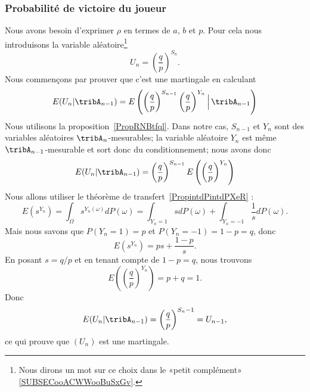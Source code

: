 \subsubsection{Probabilité de victoire du joueur}

Nous avons besoin d'exprimer \( \rho\) en termes de \( a\), \( b\) et \( p\). Pour cela nous introduisons la variable aléatoire\footnote{Nous dirons un mot sur ce choix dans le «petit complément» \ref{SUBSECooACWWooBuSxGv}.}
\begin{equation}    \label{EqFUsSnit}
	U_n=\left( \frac{ q }{ p } \right)^{S_n}.
\end{equation}
Nous commençons par prouver que c'est une martingale en calculant
\begin{equation}
	E(U_n|\tribA_{n-1})=E\left( \left( \frac{ q }{ p } \right)^{S_{n-1}}\left( \frac{ q }{ p } \right)^{Y_n} \Big |\,\tribA_{n-1} \right)
\end{equation}
Nous utilisons la proposition~\ref{PropRNBtfql}. Dans notre cas, \( S_{n-1}\) et \( Y_n\) sont des variables aléatoires \( \tribA_n\)-mesurables; la variable aléatoire \( Y_n\) est même \( \tribA_{n-1}\)-mesurable et sort donc du conditionnement; nous avons donc
\begin{equation}    \label{EqWTkXcEK}
	E(U_n|\tribA_{n-1})=\left( \frac{ q }{ p } \right)^{S_{n-1}}E\left( \left( \frac{ q }{ p } \right)^{Y_n} \right)
\end{equation}
Nous allons utiliser le théorème de transfert~\ref{PropintdPintdPXeR} :
\begin{equation}
	E(s^{Y_n})=\int_{\Omega}s^{Y_n(\omega)}dP(\omega)=\int_{Y_n=1}sdP(\omega)+\int_{Y_n=-1}\frac{1}{ s }dP(\omega).
\end{equation}
Mais nous savons que \( P(Y_n=1)=p\) et \( P(Y_n=-1)=1-p=q\), donc
\begin{equation}
	E(s^{Y_n})=ps+\frac{ 1-p }{ s }.
\end{equation}
En posant \( s=q/p\) et en tenant compte de \( 1-p=q\), nous trouvons
\begin{equation}
	E\left( \left( \frac{ q }{ p } \right)^{Y_n} \right)=p+q=1.
\end{equation}
Donc
\begin{equation}
	E(U_n|\tribA_{n-1})=\left( \frac{ q }{ p } \right)^{S_n-1}=U_{n-1},
\end{equation}
ce qui prouve que \( (U_n)\) est une martingale.

